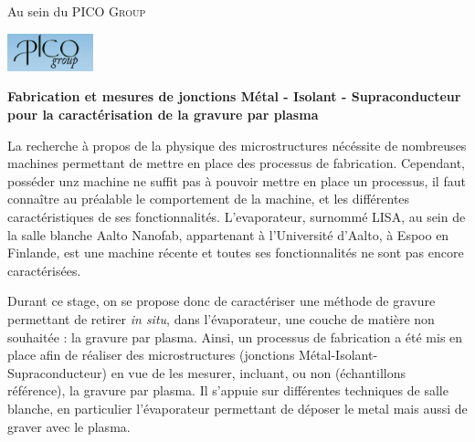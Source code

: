 \documentclass[a4paper,12pt]{report}
\begin{document}
\begin{titlepage}
\begin{center}
    Au sein du PICO \textsc{Group}
    \vspace{0.3cm}
    
    \includegraphics[width=25mm]{logopico.png}
    \vspace{0.8cm}
    
    \vspace{0.2cm}
    
       \end{center}
\end{titlepage}

    \newpage
 \pagestyle{empty}
 
    \begin{Large}
    \textbf{Fabrication et mesures de jonctions Métal - Isolant - Supraconducteur pour la caractérisation de la gravure par plasma}
\end{Large}

\vspace{0.5cm}

La recherche à propos de la physique des microstructures nécéssite de nombreuses machines permettant de mettre en place des processus de fabrication. Cependant, posséder unz machine ne suffit pas à pouvoir mettre en place un processus, il faut connaître au préalable le comportement de la machine, et les différentes caractéristiques de ses fonctionnalités. L'evaporateur, surnommé LISA, au sein de la salle blanche Aalto Nanofab, appartenant à l'Université d'Aalto, à Espoo en Finlande, est une machine récente et toutes ses fonctionnalités ne sont pas encore caractérisées. 

Durant ce stage, on se propose donc de  caractériser une méthode de gravure permettant de retirer \textit{in situ}, dans l'évaporateur, une couche de matière non souhaitée : la gravure par plasma. Ainsi, un processus de fabrication a été mis en place afin de réaliser des microstructures (jonctions Métal-Isolant-Supraconducteur) en vue de les mesurer, incluant, ou non (échantillons référence), la gravure par plasma. Il s'appuie sur différentes techniques de salle blanche, en particulier l'évaporateur permettant de déposer le metal mais aussi de graver avec le plasma. 
\end{document}
